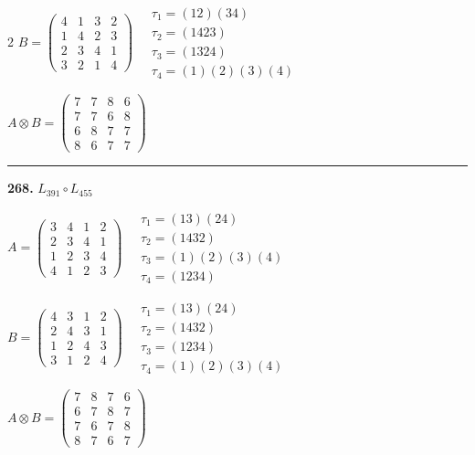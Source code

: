 \begin{multicols}{2}
$B = \begin{pmatrix} 4 & 1 & 3 & 2 \\ 1 & 4 & 2 & 3 \\ 2 & 3 & 4 & 1 \\ 3 & 2 & 1 & 4 \end{pmatrix} \quad \begin{matrix} \tau_{1}=(1 2)(3 4) \\ \tau_{2}=(1 4 2 3) \\ \tau_{3}=(1 3 2 4) \\ \tau_{4}=(1)(2)(3)(4) \end{matrix}$

$A \otimes B = \begin{pmatrix} 7 & 7 & 8 & 6 \\ 7 & 7 & 6 & 8 \\ 6 & 8 & 7 & 7 \\ 8 & 6 & 7 & 7 \end{pmatrix}$

\vspace{0.3em}
\hrule
\vspace{0.3em}

\noindent\textbf{268.} $L_{391} \circ L_{455}$

$A = \begin{pmatrix} 3 & 4 & 1 & 2 \\ 2 & 3 & 4 & 1 \\ 1 & 2 & 3 & 4 \\ 4 & 1 & 2 & 3 \end{pmatrix} \quad \begin{matrix} \tau_{1}=(1 3)(2 4) \\ \tau_{2}=(1 4 3 2) \\ \tau_{3}=(1)(2)(3)(4) \\ \tau_{4}=(1 2 3 4) \end{matrix}$

$B = \begin{pmatrix} 4 & 3 & 1 & 2 \\ 2 & 4 & 3 & 1 \\ 1 & 2 & 4 & 3 \\ 3 & 1 & 2 & 4 \end{pmatrix} \quad \begin{matrix} \tau_{1}=(1 3)(2 4) \\ \tau_{2}=(1 4 3 2) \\ \tau_{3}=(1 2 3 4) \\ \tau_{4}=(1)(2)(3)(4) \end{matrix}$

$A \otimes B = \begin{pmatrix} 7 & 8 & 7 & 6 \\ 6 & 7 & 8 & 7 \\ 7 & 6 & 7 & 8 \\ 8 & 7 & 6 & 7 \end{pmatrix}$


\end{multicols}
